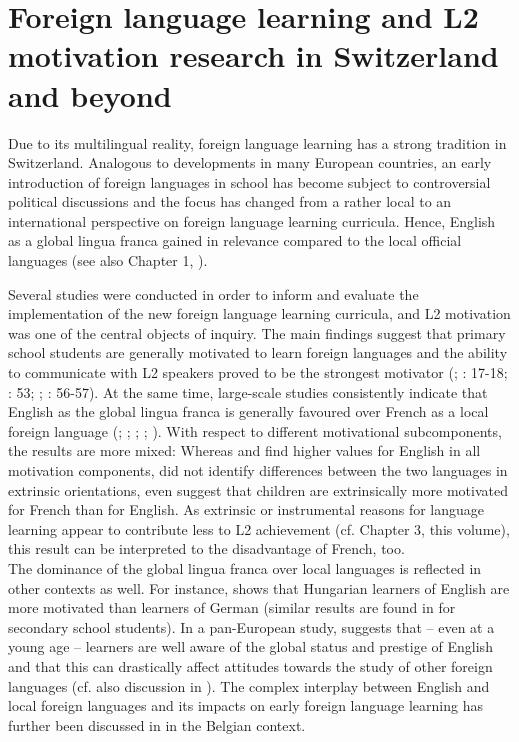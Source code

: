 \documentclass[output=paper]{langsci/langscibook}
\begin{document}
\section{Foreign language learning and L2 motivation research in Switzerland and beyond}

Due to its multilingual reality, foreign language learning has a strong tradition in Switzerland. Analogous to developments in many European countries, an early introduction of foreign languages in school has become subject to controversial political discussions and the focus has changed from a rather local to an international perspective on foreign language learning curricula. Hence, English as a global lingua franca gained in relevance compared to the local official languages (see also Chapter 1, ).

Several studies were conducted in order to inform and evaluate the implementation of the new foreign language learning curricula, and L2 motivation was one of the central objects of inquiry. The main findings suggest that primary school students are generally motivated to learn foreign languages and the ability to communicate with L2 speakers proved to be the strongest motivator (\citealt{BaderSchaer2005}; \citealt{HusfeldtBaderLehmann2009}: 17-18; \citealt{OwEtAl2012}: 53; \citealt{KreisEtAl2014}; \citealt{WiedenkellerLenz2019}: 56-57). At the same time, large-scale studies consistently indicate that English as the global lingua franca is generally favoured over French as a local foreign language (\citealt{Stoeckli2004}; \citealt{Heinzmann2010,Heinzmann2013}; \citealt{PeyerEtAl2016}; \citealt{BruehwilerLePapeRacine2017}; \citealt{PfenningerSingleton2017}). With respect to different motivational subcomponents, the results are more mixed: Whereas \citet[14-15]{Heinzmann2010} and \citet[6-7]{PeyerEtAl2016} find higher values for English in all motivation components, \citet[59-60]{Stoeckli2004} did not identify differences between the two languages in extrinsic orientations, \citet[173]{BruehwilerLePapeRacine2017} even suggest that children are extrinsically more motivated for French than for English. As extrinsic or instrumental reasons for language learning appear to contribute less to L2 achievement (cf. Chapter 3, this volume), this result can be interpreted to the disadvantage of French, too. \\
The dominance of the global lingua franca over local languages is reflected in other contexts as well. For instance, \citet[103--104]{Nikolov2009} shows that Hungarian learners of English are more motivated than learners of German (similar results are found in \citealt{CsizerLukacs2010} for secondary school students). In a pan-European study, \citet{Busse2017} suggests that – even at a young age -- learners are well aware of the global status and prestige of English and that this can drastically affect attitudes towards the study of other foreign languages (cf. also discussion in \citealt{Ushioda2017}). The complex interplay between English and local foreign languages and its impacts on early foreign language learning has further been discussed in \citet{BuylHousen2014} in the Belgian context.
\end{document}
